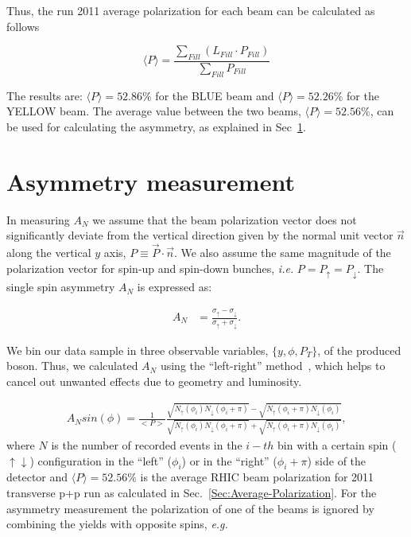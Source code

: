 \documentclass[12pt]{article}
\begin{document}
Thus, the run 2011 average polarization for each beam can be calculated as follows

\begin{equation}
\label{eq_AvePolarization}
\langle P \rangle = \frac {\sum\limits_{Fill} (L_{Fill} \cdot P_{Fill})} {\sum\limits_{Fill} P_{Fill}}
\end{equation}

The results are: $\langle P \rangle = 52.86\%$ for the BLUE beam and $\langle P \rangle = 52.26\%$ for the YELLOW beam. The average value between the two beams,  $\langle P \rangle = 52.56\%$, can be used for calculating the asymmetry, as explained in Sec~\ref{Sec:W-An-measurement}.

\section{Asymmetry measurement} \label{Sec:W-An-measurement}
In measuring $A_{N}$ we assume that the beam polarization vector does not significantly
deviate from the vertical direction given by the normal unit vector $\vec n$
along the vertical $y$ axis, $P \equiv \vec{P} \cdot \vec{n}$. 
We also assume the same magnitude of the polarization vector for
spin-up and spin-down bunches, \textit{i.e.} $P = P_\uparrow = P_\downarrow$.
The single spin asymmetry $A_N$ is expressed as:

\begin{align}
\label{eq_anapower}
A_N &= \frac{\sigma_\uparrow - \sigma_\downarrow}{\sigma_\uparrow +
   \sigma_\downarrow}.
\end{align}

We bin our data sample in three observable variables, $\{y, \phi, P_T\}$, of the produced boson. Thus, 
we calculated $A_{N}$ using the ``left-right'' method~\cite{sqrtFormula}, which helps to cancel out unwanted effects due to geometry and luminosity.

\begin{align}
A_{N } sin(\phi)= \frac{1}{<P>}
\frac{\sqrt{N_\uparrow(\phi_i)N_\downarrow(\phi_i+\pi)} - \sqrt{N_\uparrow(\phi_i+\pi)N_\downarrow(\phi_i)} } 
{\sqrt{N_\uparrow(\phi_i)N_\downarrow(\phi_i+\pi)} + \sqrt{N_\uparrow(\phi_i+\pi)N_\downarrow(\phi_i)}},
\end{align}
where $N$ is the number of recorded events in the $i-th$ bin with a certain spin ($\uparrow \downarrow$) configuration in the ``left'' ($\phi_{i}$) or in the ``right'' ($\phi_{i} + \pi$) side of the detector and $\langle P \rangle = 52.56\%$ is the average RHIC beam polarization for 2011 transverse p+p run as calculated in Sec.~\ref{Sec:Average-Polarization}.  
For the asymmetry measurement the polarization of one of the beams is ignored by combining the
yields with opposite spins, \textit{e.g.}
\end{document}
